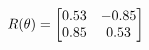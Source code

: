 \documentclass[preview]{standalone}
\begin{document}
\begin{align*}
\special{dvisvgm:raw <g id='unique000'>}R(\theta) = \begin{bmatrix}0.53 & -0.85\\0.85 & 0.53\end{bmatrix}\special{dvisvgm:raw </g>}
\end{align*}
\end{document}
